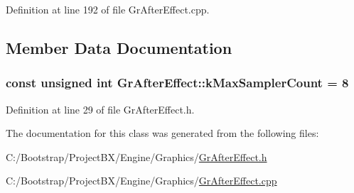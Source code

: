 Definition at line 192 of file GrAfterEffect.cpp.

\subsection{Member Data Documentation}
\hypertarget{class_gr_after_effect_ff8b6c747e2b149a857a58f0491a4189}{
\subsubsection[{kMaxSamplerCount}]{\setlength{\rightskip}{0pt plus 5cm}const unsigned int {\bf GrAfterEffect::kMaxSamplerCount} = 8}}
\label{class_gr_after_effect_ff8b6c747e2b149a857a58f0491a4189}




Definition at line 29 of file GrAfterEffect.h.

The documentation for this class was generated from the following files:\begin{CompactItemize}
\item 
C:/Bootstrap/ProjectBX/Engine/Graphics/\hyperlink{_gr_after_effect_8h}{GrAfterEffect.h}\item 
C:/Bootstrap/ProjectBX/Engine/Graphics/\hyperlink{_gr_after_effect_8cpp}{GrAfterEffect.cpp}\end{CompactItemize}
